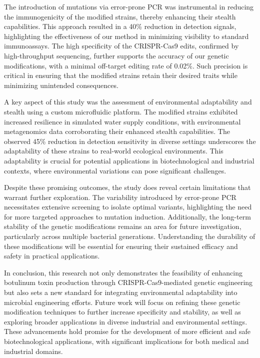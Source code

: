 \documentclass{article}
\begin{document}
The introduction of mutations via error-prone PCR was instrumental in reducing the immunogenicity of the modified strains, thereby enhancing their stealth capabilities. This approach resulted in a 40\% reduction in detection signals, highlighting the effectiveness of our method in minimizing visibility to standard immunoassays. The high specificity of the CRISPR-Cas9 edits, confirmed by high-throughput sequencing, further supports the accuracy of our genetic modifications, with a minimal off-target editing rate of 0.02\%. Such precision is critical in ensuring that the modified strains retain their desired traits while minimizing unintended consequences.

A key aspect of this study was the assessment of environmental adaptability and stealth using a custom microfluidic platform. The modified strains exhibited increased resilience in simulated water supply conditions, with environmental metagenomics data corroborating their enhanced stealth capabilities. The observed 45\% reduction in detection sensitivity in diverse settings underscores the adaptability of these strains to real-world ecological environments. This adaptability is crucial for potential applications in biotechnological and industrial contexts, where environmental variations can pose significant challenges.

Despite these promising outcomes, the study does reveal certain limitations that warrant further exploration. The variability introduced by error-prone PCR necessitates extensive screening to isolate optimal variants, highlighting the need for more targeted approaches to mutation induction. Additionally, the long-term stability of the genetic modifications remains an area for future investigation, particularly across multiple bacterial generations. Understanding the durability of these modifications will be essential for ensuring their sustained efficacy and safety in practical applications.

In conclusion, this research not only demonstrates the feasibility of enhancing botulinum toxin production through CRISPR-Cas9-mediated genetic engineering but also sets a new standard for integrating environmental adaptability into microbial engineering efforts. Future work will focus on refining these genetic modification techniques to further increase specificity and stability, as well as exploring broader applications in diverse industrial and environmental settings. These advancements hold promise for the development of more efficient and safe biotechnological applications, with significant implications for both medical and industrial domains.
\end{document}
